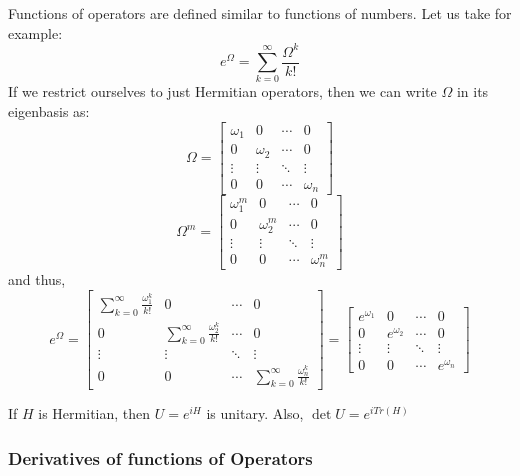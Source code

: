 \documentclass[12pt,a4paper]{report}
\begin{document}
Functions of operators are defined similar to functions of numbers. Let us take for example:
\begin{equation*}
    e^\Omega = \sum_{k=0}^\infty \frac{\Omega^k}{k!}
\end{equation*}
If we restrict ourselves to just Hermitian operators, then we can write $\Omega$ in its eigenbasis as:
\begin{equation*}
    \Omega = \begin{bmatrix}
        \omega_1 & 0 & \cdots & 0 \\
        0 & \omega_2 & \cdots & 0 \\
        \vdots & \vdots & \ddots & \vdots \\
        0 & 0 & \cdots & \omega_n
    \end{bmatrix}
\end{equation*}
\begin{equation*}
    \Omega^m = \begin{bmatrix}
        \omega_1^m & 0 & \cdots & 0 \\
        0 & \omega_2^m & \cdots & 0 \\
        \vdots & \vdots & \ddots & \vdots \\
        0 & 0 & \cdots & \omega_n^m
    \end{bmatrix}
\end{equation*}
and thus,
\begin{equation*}
    e^\Omega = \begin{bmatrix}
        \sum_{k=0}^\infty \frac{\omega_1^k}{k!} & 0 & \cdots & 0 \\
        0 & \sum_{k=0}^\infty \frac{\omega_2^k}{k!} & \cdots & 0 \\
        \vdots & \vdots & \ddots & \vdots \\
        0 & 0 & \cdots & \sum_{k=0}^\infty \frac{\omega_n^k}{k!}
    \end{bmatrix} = \begin{bmatrix}
        e^{\omega_1} & 0 & \cdots & 0 \\
        0 & e^{\omega_2} & \cdots & 0 \\
        \vdots & \vdots & \ddots & \vdots \\
        0 & 0 & \cdots & e^{\omega_n}
    \end{bmatrix}
\end{equation*}

If $H$ is Hermitian, then $U = e^{iH}$ is unitary. Also, $\det U = e^{iTr(H)}$

\subsubsection{Derivatives of functions of Operators}
\end{document}
